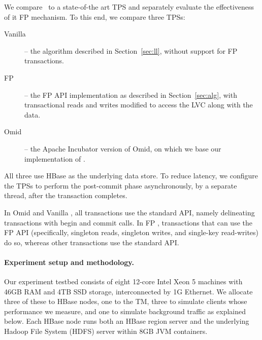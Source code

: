 

We compare \sys\  to a state-of-the art TPS and separately evaluate the effectiveness of it FP mechanism.
To this end, we compare three TPSs: 
\begin{description}
\item[Vanilla \sys] -- the algorithm described in Section~\ref{sec:ll}, without support for FP transactions.
\item[FP \sys] -- the FP API implementation as described in Section~\ref{sec:alg},
with transactional reads and writes  modified to access the LVC along with the data.
\item[Omid] -- the Apache Incubator version of Omid, on which we base
our implementation of \sys. 
\end{description}

All three use HBase as the underlying data store. To reduce latency,
we configure the TPSs to perform the post-commit phase asynchronously, 
by a separate thread, after the transaction completes.

In Omid and Vanilla \sys, all transactions use the standard API, namely 
delineating transactions with begin and commit calls.
In FP \sys, transactions that can use the FP API (specifically, singleton reads, singleton writes, 
and single-key read-writes) do so, whereas other transactions use the standard API.

\paragraph{Experiment setup and methodology.}

Our experiment testbed consists of eight 12-core Intel Xeon 5 machines with 46GB RAM and 4TB 
SSD storage, interconnected by 1G Ethernet. We allocate three of these to HBase nodes, 
one to the TM,
three to simulate clients whose performance we measure, and one to simulate background traffic
as explained below. 
Each HBase node runs both an HBase region server and the underlying 
Hadoop File System (HDFS) server within 8GB JVM containers. 

